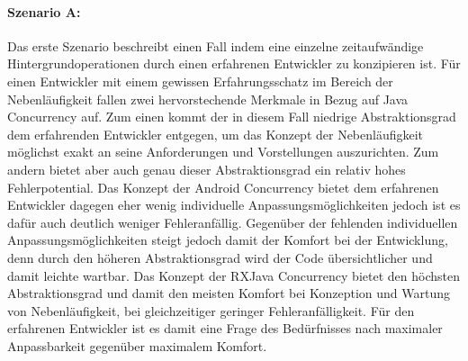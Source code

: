 \documentclass[12pt,oneside,a4paper,bibtotoc,liststotoc]{scrreprt}
\begin{document}
\paragraph{Szenario A:}
Das erste Szenario beschreibt einen Fall indem eine einzelne zeitaufwändige Hintergrundoperationen durch einen erfahrenen Entwickler zu konzipieren ist. Für einen Entwickler mit einem gewissen Erfahrungsschatz im Bereich der Nebenläufigkeit fallen zwei hervorstechende Merkmale in Bezug auf Java Concurrency auf. Zum einen kommt der in diesem Fall niedrige Abstraktionsgrad dem erfahrenden Entwickler entgegen, um das Konzept der Nebenläufigkeit möglichst exakt an seine Anforderungen und Vorstellungen auszurichten. Zum andern bietet aber auch genau dieser Abstraktionsgrad ein relativ hohes Fehlerpotential.
Das Konzept der Android Concurrency bietet dem erfahrenen Entwickler dagegen eher wenig individuelle Anpassungsmöglichkeiten jedoch ist es dafür auch deutlich weniger Fehleranfällig. Gegenüber der fehlenden individuellen Anpassungsmöglichkeiten steigt jedoch damit der Komfort bei der Entwicklung, denn durch den höheren Abstraktionsgrad wird der Code übersichtlicher und damit leichte wartbar.
Das Konzept der RXJava Concurrency bietet den höchsten Abstraktionsgrad und damit den meisten Komfort bei Konzeption und Wartung von Nebenläufigkeit, bei gleichzeitiger geringer Fehleranfälligkeit.
Für den erfahrenen Entwickler ist es damit eine Frage des Bedürfnisses nach maximaler Anpassbarkeit gegenüber maximalem Komfort.
\end{document}
